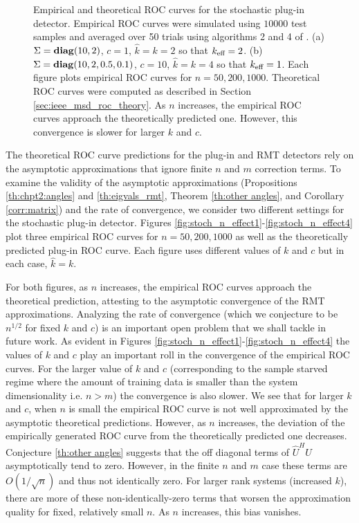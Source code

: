 \begin{figure}[t]
\caption{Empirical and theoretical ROC curves for the stochastic plug-in detector. Empirical ROC curves were simulated using $10000$ test samples and averaged over 50 trials using algorithms 2 and 4 of \cite{fawcett2006introduction}. (a) $\Sigma=\mathop{\bf diag}(10,2)$, $c=1$, $\widehat{k}=k=2$ so that $k_\text{eff}=2$. (b) $\Sigma=\mathop{\bf diag}(10,2,0.5,0.1)$, $c=10$, $\widehat{k}=k=4$ so that $k_\text{eff}=1$. Each figure plots empirical ROC curves for $n=50,200,1000$. Theoretical ROC curves were computed as described in Section \ref{sec:ieee_msd_roc_theory}. As $n$ increases, the empirical ROC curves approach the theoretically predicted one. However, this convergence is slower for larger $k$ and $c$.}
\vspace{-0.3in}
\end{figure}

The theoretical ROC curve predictions for the plug-in and RMT detectors rely on the asymptotic approximations that ignore finite $n$ and $m$ correction terms. To examine the validity of the asymptotic approximations (Propositions \ref{th:chpt2:angles} and \ref{th:eigvals_rmt}, Theorem \ref{th:other angles}, and Corollary \ref{corr:matrix}) and the rate of convergence, we consider two different settings for the stochastic plug-in detector. Figures \ref{fig:stoch_n_effect1}-\ref{fig:stoch_n_effect4} plot three empirical ROC curves for $n=50,200,1000$ as well as the theoretically predicted plug-in ROC curve. Each figure uses different values of $k$ and $c$ but in each case, $\widehat{k}=k$.

For both figures, as $n$ increases, the empirical ROC curves approach the theoretical prediction, attesting to the asymptotic convergence of the RMT approximations. Analyzing the rate of convergence (which we conjecture to be $n^{1/2}$ for fixed $k$ and $c$) is an important open problem that we shall tackle in future work. As evident in Figures \ref{fig:stoch_n_effect1}-\ref{fig:stoch_n_effect4} the values of $k$ and $c$ play an important roll in the convergence of the empirical ROC curves. For the larger value of $k$ and $c$ (corresponding to the sample starved regime where the amount of training data is smaller than the system dimensionality i.e. $n>m$) the convergence is also slower. We see that for larger $k$ and $c$, when $n$ is small the empirical ROC curve is not well approximated by the asymptotic theoretical predictions. However, as $n$ increases, the deviation of the empirically generated ROC curve from the theoretically predicted one decreases. Conjecture \ref{th:other angles} suggests that the off diagonal terms of $\widehat{U}^HU$ asymptotically tend to zero. However, in the finite $n$ and $m$ case these terms are $O(1/\sqrt{n})$ and thus not identically zero. For larger rank systems (increased $k$), there are more of these non-identically-zero terms that worsen the approximation quality for fixed, relatively small $n$. As $n$ increases, this bias vanishes.

